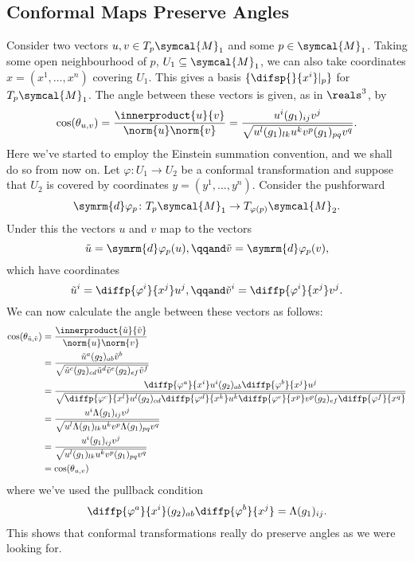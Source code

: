 \documentclass[fleqn]{NotesClass}
\newcommand{\manifold}{\symcal{M}}
\renewcommand{\dl}[1]{\symrm{d}#1}
\begin{document}
    \subsection{Conformal Maps Preserve Angles}
    Consider two vectors \(u, v \in T_p\manifold_1\) and some \(p \in \manifold_1\).
    Taking some open neighbourhood of \(p\), \(U_1 \subseteq \manifold_1\), we can also take coordinates \(x = (x^1, \dotsc, x^n)\) covering \(U_1\).
    This gives a basis \(\{\difsp{}{x^i}|_p\}\) for \(T_p\manifold_1\).
    The angle between these vectors is given, as in \(\reals^3\), by
    \begin{equation}
        \cos(\theta_{u, v}) = \frac{\innerproduct{u}{v}}{\norm{u} \norm{v}} = \frac{u^i (g_1)_{ij} v^j}{\sqrt{u^l(g_1)_{lk}u^k v^p (g_1)_{pq} v^q}}.
    \end{equation}
    Here we've started to employ the Einstein summation convention, and we shall do so from now on.
    Let \(\varphi \colon U_1 \to U_2\) be a conformal transformation and suppose that \(U_2\) is covered by coordinates \(y = (y^1, \dotsc, y^n)\).
    Consider the pushforward
    \begin{equation}
        \dl{\varphi_p} \colon T_p \manifold_1 \to T_{\varphi(p)} \manifold_2.
    \end{equation}
    Under this the vectors \(u\) and \(v\) map to the vectors
    \begin{equation}
        \tilde{u} = \dl{\varphi_p}(u), \qqand \tilde{v} = \dl{\varphi_p}(v),
    \end{equation}
    which have coordinates
    \begin{equation}
        \tilde{u}^i = \diffp{\varphi^i}{x^j} u^j, \qqand \tilde{v}^i = \diffp{\varphi^i}{x^j} v^j.
    \end{equation}
    We can now calculate the angle between these vectors as follows:
    \begin{align}
        \cos(\theta_{\tilde{u}, \tilde{v}}) &= \frac{\innerproduct{\tilde{u}}{\tilde{v}}}{\norm{u} \norm{v}}\\
        &= \frac{\tilde{u}^a (g_2)_{ab} \tilde{v}^b}{\sqrt{\tilde{u}^c(g_2)_{cd} \tilde{u}^d \tilde{v}^e (g_2)_{ef} \tilde{v}^f}}\\
        &= \frac{\diffp{\varphi^a}{x^i} u^i (g_2)_{ab} \diffp{\varphi^b}{x^j} u^j}{\sqrt{\diffp{\varphi^c}{x^l} u^l (g_2)_{cd} \diffp{\varphi^d}{x^k} u^k \diffp{\varphi^e}{x^p} v^p (g_2)_{ef} \diffp{\varphi^f}{x^q}}}\\
        &= \frac{u^i \Lambda(g_1)_{ij} v^j}{\sqrt{u^l \Lambda(g_1)_{lk}u^k v^p \Lambda(g_1)_{pq}v^q}}\\
        &= \frac{u^i (g_1)_{ij} v^j}{\sqrt{u^l (g_1)_{lk}u^k v^p (g_1)_{pq}v^q}}\\
        &= \cos(\theta_{u,v})
    \end{align}
    where we've used the pullback condition
    \begin{equation}
        \diffp{\varphi^a}{x^i} (g_2)_{ab} \diffp{\varphi^b}{x^j} = \Lambda (g_1)_{ij}.
    \end{equation}
    This shows that conformal transformations really do preserve angles as we were looking for.
    
\end{document}
